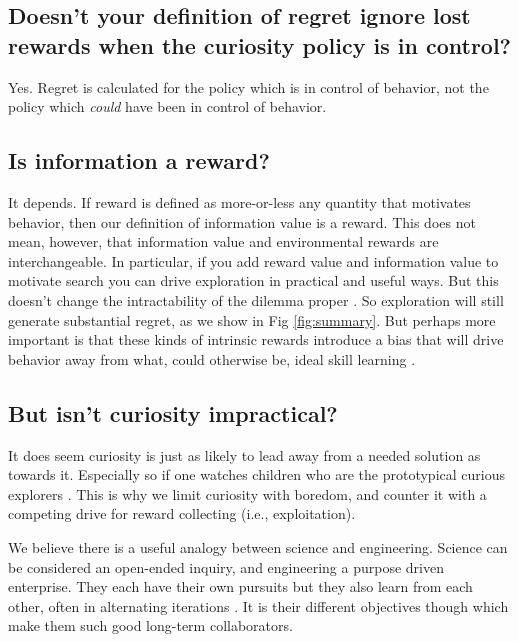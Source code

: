 \subsection{Doesn't your definition of regret ignore lost rewards when the curiosity policy is in control?}
Yes. Regret is calculated for the policy which is in control of behavior, not the policy which \textit{could} have been in control of behavior.


\subsection*{Is information a reward?}
It depends. If reward is defined as more-or-less any quantity that motivates behavior, then our definition of information value is a reward. This does not mean, however, that information value and environmental rewards are interchangeable. In particular, if you add reward value and information value to motivate search you can drive exploration in practical and useful ways. But this doesn't change the intractability of the dilemma proper \citep{Thrun1992a,Dayan1996,Findling2018,Gershman2018b}. So exploration will still generate substantial regret, as we show in Fig \ref{fig:summary}. But perhaps more important is that these kinds of intrinsic rewards \citep{Schmidhuber1991,Berger-Tal2014,Itti2009,Kobayashi2019} introduce a bias that will drive behavior away from what, could otherwise be, ideal skill learning \citep{Ng1999,Simsek2006}.


\subsection*{But isn't curiosity impractical?}
It does seem curiosity is just as likely to lead away from a needed solution as towards it. Especially so if one watches children who are the prototypical curious explorers \citep{Sumner2019,Kidd2015}. This is why we limit curiosity with boredom, and counter it with a competing drive for reward collecting (i.e., exploitation). 

We believe there is a useful analogy between science and engineering. Science can be considered an open-ended inquiry, and engineering a purpose driven enterprise. They each have their own pursuits but they also learn from each other, often in alternating iterations \citep{Gupta2006}. It is their different objectives though which make them such good long-term collaborators.


